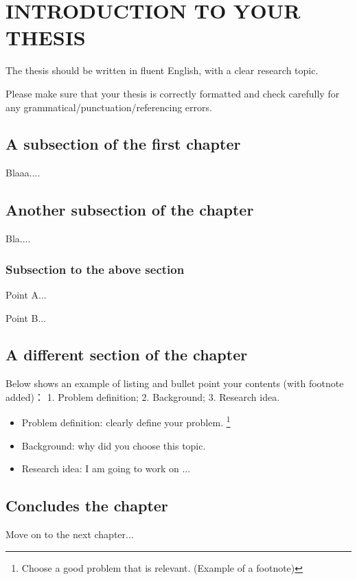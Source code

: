 
\chapter{INTRODUCTION TO YOUR THESIS}

The thesis should be written in fluent English, with a clear research topic.

Please make sure that your thesis is correctly formatted and check carefully for any grammatical/punctuation/referencing errors.


\section{A subsection of the first chapter}

Blaaa....



\section{Another subsection of the chapter}

Bla....



\subsection{Subsection to the above section}

Point A...

Point B...


\section{A different section of the chapter}

Below shows an example of listing and bullet point your contents (with footnote added)：
1. Problem definition;
2. Background; 
3. Research idea.
\begin{itemize}
  \item Problem definition: clearly define your problem. \footnote{Choose a good problem that is relevant. (Example of a footnote)}
  \item Background: why did you choose this topic.
  \item Research idea: I am going to work on ...
\end{itemize}



\section{Concludes the chapter}

Move on to the next chapter...

